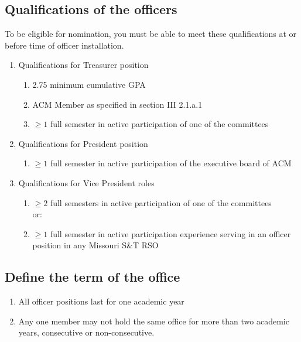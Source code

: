   \subsection{Qualifications of the officers}
    To be eligible for nomination, you must be able to meet these qualifications at or before
    time of officer installation.
    \begin{enumerate}[label=\arabic*.]
      \item Qualifications for Treasurer position
        \begin{enumerate}[label=\arabic*.]
          \item 2.75 minimum cumulative GPA
          \item ACM Member as specified in section III 2.1.a.1
          \item $\geq{1}$ full semester in active participation of one of the
          committees
        \end{enumerate}
      \item Qualifications for President position
        \begin{enumerate}[label=\arabic*.]
          \item $\geq{1}$ full semester in active participation of the executive
          board of ACM
        \end{enumerate}
      \item Qualifications for Vice President roles
        \begin{enumerate}[label=\arabic*.]
          \item $\geq{2}$ full semesters in active participation of one of the
          committees\\
          or:
          \item $\geq{1}$ full semester in active participation experience
          serving in an officer position in any Missouri S\&T RSO
        \end{enumerate}
    \end{enumerate}

  \subsection{Define the term of the office}
    \begin{enumerate}[label=\arabic*.]
      \item All officer positions last for one academic year
      \item Any one member may not hold the same office for more than two
      academic years, consecutive or non-consecutive.
    \end{enumerate}

